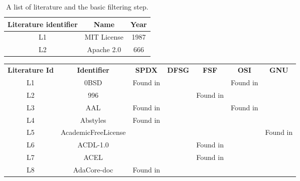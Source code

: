 
\begin{table}[h]
	\begin{center}
		\begin{tabular}{c | c | c} 
			\hline
			Literature identifier & Name & Year\\
			\hline
			L1 & MIT License & 1987 \\
			L2 & Apache 2.0 & 666 \\
		\end{tabular}
		\caption{A list of literature and the basic filtering step.}
		\label{table:appendix:a}
	\end{center}
\end{table}

\begin{table}[]
  \begin{tabular}{c|c|c|c|c|c|c}
  \textbf{Literature Id} & \textbf{Identifier}                            & \textbf{SPDX} & \textbf{DFSG} & \textbf{FSF} & \textbf{OSI} & \textbf{GNU} \\
  L1                             & 0BSD                                           & Found in      &               &              & Found in     &              \\
  L2                             & 996                                            &               &               & Found in     &              &              \\
  L3                             & AAL                                            & Found in      &               &              & Found in     &              \\
  L4                             & Abstyles                                       & Found in      &               &              &              &              \\
  L5                             & AcademicFreeLicense                            &               &               &              &              & Found in     \\
  L6                             & ACDL-1.0                                       &               &               & Found in     &              &              \\
  L7                             & ACEL                                           &               &               & Found in     &              &              \\
  L8                             & AdaCore-doc                                    & Found in      &               &              &              &              \\

\end{tabular}
\end{table}
